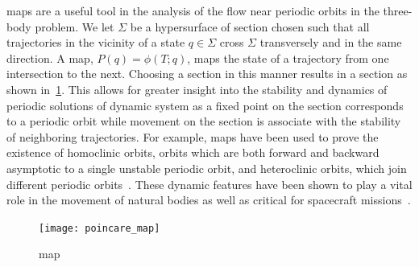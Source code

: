 \documentclass[preprint]{elsarticle}
\begin{document}
\Poincare maps are a useful tool in the analysis of the flow near periodic orbits in the three-body problem.
We let \( \Sigma \) be a hypersurface of section chosen such that all trajectories in the vicinity of a state \( q \in \Sigma \) cross \( \Sigma \) transversely and in the same direction.
A \Poincare map, \( P(q) = \phi(T;q) \), maps the state of a trajectory from one intersection to the next.
Choosing a section in this manner results in a \Poincare section as shown in~\cref{fig:poincare_map}.
This allows for greater insight into the stability and dynamics of periodic solutions of dynamic system as a fixed point on the \Poincare section corresponds to a periodic orbit while movement on the section is associate with the stability of neighboring trajectories. 
For example, \Poincare maps have been used to prove the existence of homoclinic orbits, orbits which are both forward and backward asymptotic to a single unstable periodic orbit, and heteroclinic orbits, which join different periodic orbits~\cite{conley1968,koon2000b}.
These dynamic features have been shown to play a vital role in the movement of natural bodies as well as critical for spacecraft missions~\cite{lo1997,gomez2001}.
\begin{figure}
	\centering
	\texttt{[image: poincare\_map]}
	\caption{\Poincare map\label{fig:poincare_map}}
\end{figure}
\end{document}
